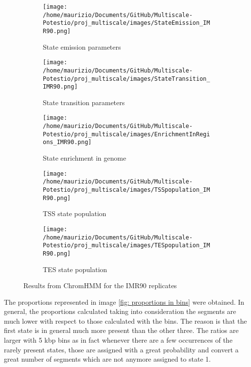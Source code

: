 \begin{figure}[H]
    \centering
    \begin{subfigure}[t]{0.06\textwidth}
      \texttt{[image: /home/maurizio/Documents/GitHub/Multiscale-Potestio/proj\_multiscale/images/StateEmission\_IMR90.png]}
      \caption{State emission parameters}
      \label{fig:State emission parameters}
  \end{subfigure}
  \begin{subfigure}[t]{0.11\textwidth}
      \texttt{[image: /home/maurizio/Documents/GitHub/Multiscale-Potestio/proj\_multiscale/images/StateTransition\_IMR90.png]}
      \caption{State transition parameters}
      \label{fig:State transition parameters}
  \end{subfigure}
  \begin{subfigure}[t]{0.15\textwidth}
      \texttt{[image: /home/maurizio/Documents/GitHub/Multiscale-Potestio/proj\_multiscale/images/EnrichmentInRegions\_IMR90.png]}
      \caption{State enrichment in genome}
      \label{fig:State enrichment in genome}
  \end{subfigure}
    \hspace{0.6\textwidth}
    \begin{subfigure}{0.39\textwidth}
      \texttt{[image: /home/maurizio/Documents/GitHub/Multiscale-Potestio/proj\_multiscale/images/TSSpopulation\_IMR90.png]}
      \caption{TSS state population}
      \label{fig:TSS state population}
    \end{subfigure}
    \begin{subfigure}{0.39\textwidth}
      \texttt{[image: /home/maurizio/Documents/GitHub/Multiscale-Potestio/proj\_multiscale/images/TESpopulation\_IMR90.png]}
      \caption{TES state population}
      \label{fig:TES state population}
    \end{subfigure}
  
    \caption{Results from ChromHMM for the IMR90 replicates}
    \label{fig:ChromHMM results}
\end{figure}


The proportions represented in image \ref{fig: proportions in bins} were obtained. In general, the proportions calculated taking into consideration the segments are much lower with respect to those calculated with the bins. The reason is that the first state is in general much more present than the other three. The ratios are larger with 5 kbp bins as in fact whenever there are a few occurrences of the rarely present states, those are assigned with a great probability and convert a great number of segments which are not anymore assigned to state 1.

